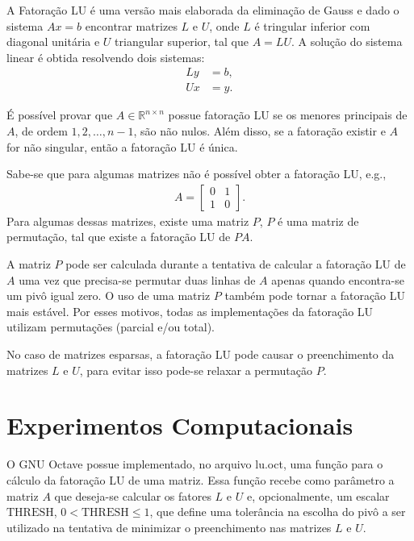 \documentclass[12pt,a4paper]{article}
\begin{document}
A Fatora\c{c}\~{a}o LU \'{e} uma vers\~{a}o mais elaborada da elimina\c{c}\~{a}o
de Gauss e dado o sistema $A x = b$ encontrar matrizes $L$ e $U$, onde $L$ \'{e}
tringular inferior com diagonal unit\'{a}ria e $U$ triangular superior, tal que
$A = L U$. A solu\c{c}\~{a}o do sistema linear \'{e} obtida resolvendo dois
sistemas:
\begin{align*}
    L y &= b, \\
    U x &= y.
\end{align*}

\'{E} poss\'{i}vel provar que $A \in \mathbb{R}^{n \times n}$ possue
fatora\c{c}\~{a}o LU se os menores principais de $A$, de ordem $1, 2, \ldots, n
- 1$, s\~{a}o n\~{a}o nulos. Al\'{e}m disso, se a fatora\c{c}\~{a}o existir e
$A$ for n\~{a}o singular, ent\~{a}o a fatora\c{c}\~{a}o LU \'{e} \'{u}nica.

Sabe-se que para algumas matrizes n\~{a}o \'{e} poss\'{i}vel obter a
fatora\c{c}\~{a}o LU, e.g.,
\begin{align*}
    A = \begin{bmatrix}
        0 & 1 \\
        1 & 0
    \end{bmatrix}.
\end{align*}
Para algumas dessas matrizes, existe uma matriz $P$, $P$ \'{e} uma matriz de
permuta\c{c}\~{a}o, tal que existe a fatora\c{c}\~{a}o LU de $P A$.

A matriz $P$ pode ser calculada durante a tentativa de calcular a fatoração LU
de $A$ uma vez que precisa-se permutar duas linhas de $A$ apenas quando
encontra-se um pivô igual zero. O uso de uma matriz $P$ também pode tornar a
fatoração LU mais estável. Por esses motivos, todas as implementações da
fatoração LU utilizam permutações (parcial e/ou total).

No caso de matrizes esparsas, a fatora\c{c}\~{a}o LU pode causar o preenchimento
da matrizes $L$ e $U$, para evitar isso pode-se relaxar a permuta\c{c}\~{a}o
$P$.

\section{Experimentos Computacionais}
O GNU Octave possue implementado, no arquivo lu.oct, uma fun\c{c}\~{a}o para o c\'{a}lculo da
fatora\c{c}\~{a}o LU de uma matriz. Essa fun\c{c}\~{a}o recebe como
par\^{a}metro a matriz $A$ que deseja-se calcular os fatores $L$ e $U$ e,
opcionalmente, um escalar $\mathrm{THRESH}$, $0 < \mathrm{THRESH} \leq 1$, que
define uma toler\^{a}ncia na escolha do piv\^{o} a ser utilizado na tentativa de
minimizar o preenchimento nas matrizes $L$ e $U$.
\end{document}
